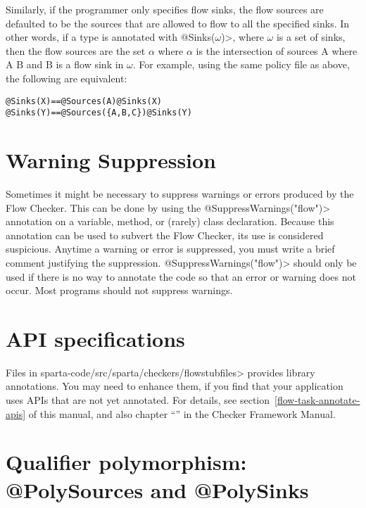 Similarly, if the programmer only specifies flow sinks, the flow sources are defaulted to be the sources 
that are allowed to flow to all the specified sinks.  In other words, if a type is annotated with 
\<@Sinks($\omega$)>, where $\omega$ is a set of sinks, then the flow sources are the set 
$\alpha$ where $\alpha$ is the intersection of sources A where A \flowsto{} B and B is a flow sink in 
$\omega$. For example, using the same policy file as above, the following are equivalent:

\begin{alltt}
  @Sinks(X)                   ==   @Sources(A) @Sinks(X)
  @Sinks(Y)                   ==   @Sources(\{A,B,C\}) @Sinks(Y)
\end{alltt}


\section{Warning Suppression\label{sec:waringsuppression}}
 
Sometimes it might be necessary to suppress warnings or errors produced by
the Flow Checker.  This can be done by using the
\<@SuppressWarnings("flow")> annotation on a variable, method, or (rarely)
class declaration.  Because this annotation can be used to subvert the Flow
Checker, its use is considered suspicious.  Anytime a warning or error is
suppressed, you must write a brief comment justifying the suppression.
\<@SuppressWarnings("flow")> should only be used if there is no way to
annotate the code so that an error or warning does not occur.  Most
programs should not suppress warnings.


\section{API specifications\label{sec:apispecs}}

Files in  \<sparta-code/src/sparta/checkers/flowstubfiles> provides library
annotations.  You may need to enhance them, if you find that your application
uses APIs that are not yet annotated.  For details, see
section~\ref{flow-task-annotate-apis} of this manual, and also 
chapter
``'' in the Checker Framework Manual.


\section{Qualifier polymorphism: @PolySources  and @PolySinks \label{sec:polyflowsources}}

